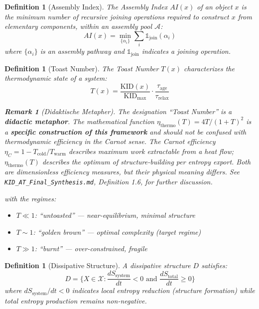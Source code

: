 \documentclass[11pt,a4paper]{article}
\newtheorem{definition}[theorem]{Definition}
\newtheorem{remark}[theorem]{Remark}
\begin{document}
\begin{definition}[Assembly Index]
The Assembly Index $AI(x)$ of an object $x$ is the minimum number of recursive joining operations required to construct $x$ from elementary components, within an assembly pool $\mathcal{A}$:
\begin{equation}
AI(x) = \min_{\{\alpha_i\}} \sum_i \mathbb{1}_{\text{join}}(\alpha_i)
\end{equation}
where $\{\alpha_i\}$ is an assembly pathway and $\mathbb{1}_{\text{join}}$ indicates a joining operation.
\end{definition}

\begin{definition}[Toast Number]
The Toast Number $T(x)$ characterizes the thermodynamic state of a system:
\begin{equation}
\boxed{T(x) = \frac{\text{KID}(x)}{\text{KID}_{\max}} \cdot \frac{\tau_{\text{age}}}{\tau_{\text{relax}}}}
\end{equation}

\begin{remark}[Didaktische Metapher]
The designation ``Toast Number'' is a \textbf{didactic metaphor}. The mathematical function $\eta_{\text{thermo}}(T) = 4T/(1+T)^2$ is a \textbf{specific construction of this framework} and should not be confused with thermodynamic efficiency in the Carnot sense. The Carnot efficiency $\eta_C = 1 - T_{\text{cold}}/T_{\text{warm}}$ describes maximum work extractable from a heat flow; $\eta_{\text{thermo}}(T)$ describes the optimum of structure-building per entropy export. Both are dimensionless efficiency measures, but their physical meaning differs. See \texttt{KID\_AT\_Final\_Synthesis.md}, Definition 1.6, for further discussion.
\end{remark}

with the regimes:
\begin{itemize}[noitemsep]
\item $T \ll 1$: ``untoasted'' --- near-equilibrium, minimal structure
\item $T \sim 1$: ``golden brown'' --- optimal complexity (target regime)
\item $T \gg 1$: ``burnt'' --- over-constrained, fragile
\end{itemize}
\end{definition}

\begin{definition}[Dissipative Structure]
A dissipative structure $D$ satisfies:
\begin{equation}
D = \{X \in \mathcal{X} : \frac{dS_{\text{system}}}{dt} < 0 \text{ and } \frac{dS_{\text{total}}}{dt} \geq 0\}
\end{equation}
where $dS_{\text{system}}/dt < 0$ indicates local entropy reduction (structure formation) while total entropy production remains non-negative.
\end{definition}
\end{document}
